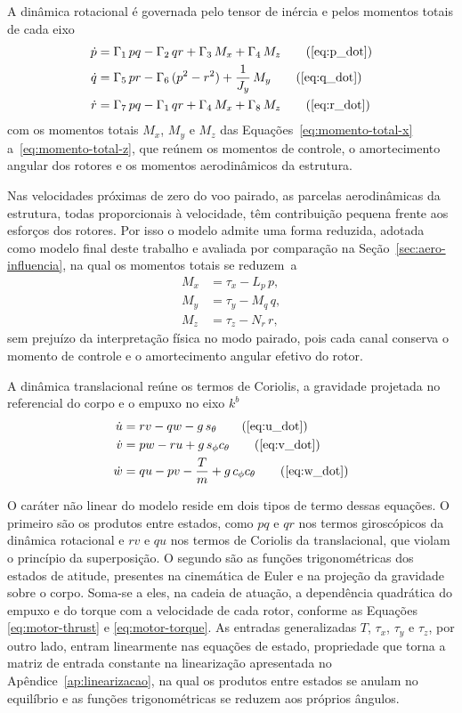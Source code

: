 A dinâmica rotacional é governada pelo tensor de inércia e pelos momentos totais de cada eixo
\begin{align*}
  \dot{p} &= \Gamma_1\,pq - \Gamma_2\,qr + \Gamma_3\,M_x + \Gamma_4\,M_z \tag{\ref{eq:p_dot}} \\
  \dot{q} &= \Gamma_5\,pr - \Gamma_6\,(p^2 - r^2) + \frac{1}{J_y}\,M_y \tag{\ref{eq:q_dot}} \\
  \dot{r} &= \Gamma_7\,pq - \Gamma_1\,qr + \Gamma_4\,M_x + \Gamma_8\,M_z \tag{\ref{eq:r_dot}}
\end{align*}
com os momentos totais $M_x$, $M_y$ e $M_z$ das Equações~\eqref{eq:momento-total-x} a~\eqref{eq:momento-total-z}, que reúnem os momentos de controle, o amortecimento angular dos rotores e os momentos aerodinâmicos da estrutura.

{\color{blue}Nas velocidades próximas de zero do voo pairado, as parcelas aerodinâmicas da estrutura, todas proporcionais à velocidade, têm contribuição pequena frente aos esforços dos rotores. Por isso o modelo admite uma forma reduzida, adotada como modelo final deste trabalho e avaliada por comparação na Seção~\ref{sec:aero-influencia}, na qual os momentos totais se reduzem~a
\begin{align}
  M_x &= \tau_x - L_p\,p, \label{eq:mom-red-x} \\
  M_y &= \tau_y - M_q\,q, \label{eq:mom-red-y} \\
  M_z &= \tau_z - N_r\,r, \label{eq:mom-red-z}
\end{align}
sem prejuízo da interpretação física no modo pairado, pois cada canal conserva o momento de controle e o amortecimento angular efetivo do rotor.}

A dinâmica translacional reúne os termos de Coriolis, a gravidade projetada no referencial do corpo e o empuxo no eixo $k^b$
\begin{align*}
  \dot{u} &= rv - qw - g\,s_\theta \tag{\ref{eq:u_dot}} \\
  \dot{v} &= pw - ru + g\,s_\phi c_\theta \tag{\ref{eq:v_dot}} \\
  \dot{w} &= qu - pv - \frac{T}{m} + g\,c_\phi c_\theta \tag{\ref{eq:w_dot}}
\end{align*}

O caráter não linear do modelo reside em dois tipos de termo dessas equações. O primeiro são os produtos entre estados, como $pq$ e $qr$ nos termos giroscópicos da dinâmica rotacional e $rv$ e $qu$ nos termos de Coriolis da translacional, que violam o princípio da superposição. O segundo são as funções trigonométricas dos estados de atitude, presentes na cinemática de Euler e na projeção da gravidade sobre o corpo. Soma-se a eles, na cadeia de atuação, a dependência quadrática do empuxo e do torque com a velocidade de cada rotor, conforme as Equações \eqref{eq:motor-thrust} e \eqref{eq:motor-torque}. As entradas generalizadas $T$, $\tau_x$, $\tau_y$ e $\tau_z$, por outro lado, entram linearmente nas equações de estado, propriedade que torna a matriz de entrada constante na linearização apresentada no Apêndice~\ref{ap:linearizacao}, na qual os produtos entre estados se anulam no equilíbrio e as funções trigonométricas se reduzem aos próprios ângulos.

